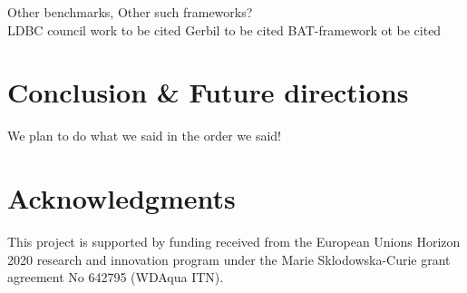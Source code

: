 \documentclass{llncs}
\begin{document}
    
    
    Other benchmarks, Other such frameworks? \\
    LDBC council work to be cited
    Gerbil to be cited
    BAT-framework ot be cited

    
    


\section{Conclusion \& Future directions}
We plan to do what we said in the order we said!
\section*{Acknowledgments}\label{sec:Acknowledgments}
This project is supported by funding received from the European Unions Horizon 2020 research and innovation program under the Marie Sklodowska-Curie grant agreement No 642795 (WDAqua ITN).



\end{document}
